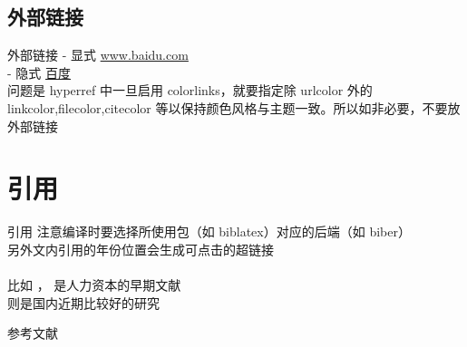 \documentclass[UTF8,14pt,aspectratio=43,dvipsnames,svgnames,x11names,hyperref={urlcolor=blue}]{beamer}
\begin{document}
\subsection[外部链接]{外部链接}
\begin{frame}{外部链接}
	- 显式 \url{www.baidu.com}\\
	- 隐式 \href{www.baidu.com}{百度}\\
	问题是 hyperref 中一旦启用 colorlinks，就要指定除 urlcolor 外的 linkcolor,filecolor,citecolor 等以保持颜色风格与主题一致。所以如非必要，不要放外部链接
\end{frame}

\section{引用}
\begin{frame}{引用}
	注意编译时要选择所使用包（如 biblatex）对应的后端（如 biber）\\
	另外文内引用的年份位置会生成可点击的超链接\\
	~\\
	比如 \cite{mincer1962job}，\cite{schultz1961investment} 是人力资本的早期文献\\
	\cite{孟望生2018人力资本统计核算方法研究述评,李海峥2010中国人力资本测度与指数构建} 则是国内近期比较好的研究
\end{frame}

\begin{frame}{参考文献}
	\AtNextBibliography{\scriptsize} %
	\nocite{*} %
	\printbibliography %
\end{frame}
\end{document}
